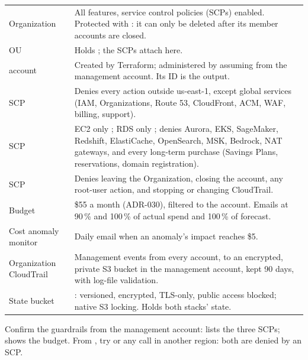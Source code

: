 \begin{xltabular}{\linewidth}{@{}P{34mm} L@{}}
  \toprule
   & \\
  \midrule
  Organization & All features, service control policies (SCPs) enabled. Protected with : it can only be deleted after its member accounts are closed.\\
   OU & Holds ; the SCPs attach here.\\
   account & Created by Terraform; administered by assuming  from the management account. Its ID is the  output.\\
  SCP  & Denies every action outside us-east-1, except global services (IAM, Organizations, Route 53, CloudFront, ACM, WAF, billing, support).\\
  SCP  & EC2 only ; RDS only ; denies Aurora, EKS, SageMaker, Redshift, ElastiCache, OpenSearch, MSK, Bedrock, NAT gateways, and every long-term purchase (Savings Plans, reservations, domain registration).\\
  SCP  & Denies leaving the Organization, closing the account, any root-user action, and stopping or changing CloudTrail.\\
  Budget  & \$55 a month (ADR-030), filtered to the account. Emails at 90\,\% and 100\,\% of actual spend and 100\,\% of forecast.\\
  Cost anomaly monitor & Daily email when an anomaly's impact reaches \$5.\\
  Organization CloudTrail & Management events from every account, to an encrypted, private S3 bucket in the management account, kept 90 days, with log-file validation.\\
  State bucket & : versioned, encrypted, TLS-only, public access blocked; native S3 locking. Holds both stacks' state.\\
  \bottomrule
\end{xltabular}

\begin{auditnote}
  Confirm the guardrails from the management account:
  lists the three SCPs;  shows the budget. From
  , try  or any call in
  another region: both are denied by an SCP.
\end{auditnote}


